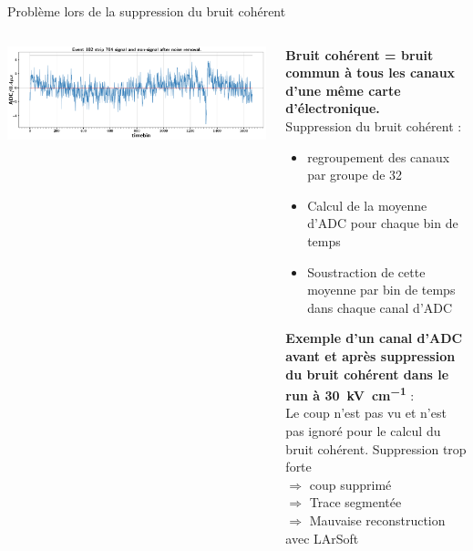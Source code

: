 \begin{frame}{Problème lors de la suppression du bruit cohérent}
\begin{scriptsize}
\begin{columns}
\begin{column}{0.45\textwidth}
                    \centering \includegraphics[width=\textwidth]{./pictures/cnsub_adcs_high_threshold.pdf}\\
                 \end{column}
                \begin{column}{0.55\textwidth}
                    \textbf{Bruit cohérent = bruit commun à tous les canaux d'une même carte d'électronique.} \\\vspace{0.3cm}
                    Suppression du bruit cohérent :
                    \begin{itemize}
                        \item regroupement des canaux par groupe de 32
                        \item Calcul de la moyenne d'ADC pour chaque bin de temps
                        \item Soustraction de cette moyenne par bin de temps dans chaque canal d'ADC
                    \end{itemize} 
                    \vspace{0.3cm}
                    \textbf{ Exemple d'un canal d'ADC avant et après suppression du bruit cohérent dans le run à \SI{30}{\kilo\volt\per\centi\meter} }: \\Le coup n'est pas vu et n'est pas ignoré pour le calcul du bruit cohérent.  Suppression trop forte \\
                    $\Rightarrow$ coup supprimé \\
                    $\Rightarrow$ Trace segmentée \\
                    $\Rightarrow$ Mauvaise reconstruction avec LArSoft \\
                \end{column}
            \end{columns}
        \end{scriptsize}
    \end{frame}

